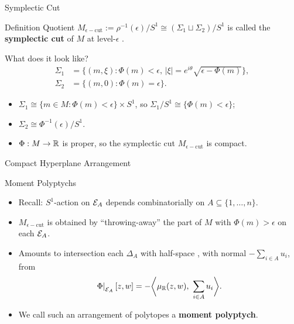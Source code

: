 \begin{frame}{Symplectic Cut}
    \begin{block}{Definition}
        Quotient $M_{\epsilon - \text{cut}} := \rho^{-1}(\epsilon)/S^{1} \cong (\Sigma_{1} \sqcup \Sigma_{2})/S^{1}$ is called the \textbf{symplectic cut} of $M$ at level-$\epsilon$ \cite{lerman1995}.
    \end{block}
    \begin{block}{What does it look like?}
        \vspace*{-18pt}
        \begin{equation*}
            \begin{split}
                \Sigma_{1} &= \big\{ (m,\xi) : \Phi(m) < \epsilon,\, |\xi| = e^{i\theta} \sqrt{\epsilon - \Phi(m)} \big\}, \\
                \Sigma_{2} &= \big\{ (m,0) : \Phi(m) = \epsilon \big\}.
            \end{split}
        \end{equation*}
        \vspace*{-12pt}
        \begin{itemize}
            \item $\Sigma_{1} \cong \{ m \in M : \Phi(m) < \epsilon \} \times S^{1}$, so $\Sigma_{1}/S^{1} \cong \{ \Phi(m) < \epsilon \}$;
            \item $\Sigma_{2} \cong \Phi^{-1}(\epsilon)/S^{1}$.
            \item $\Phi : M \rightarrow \mathbb{R}$ is proper, so the symplectic cut $M_{\epsilon-\text{cut}}$ is compact.
        \end{itemize}
    \end{block}
\end{frame}

\begin{frame}{Compact Hyperplane Arrangement}
    \begin{block}{Moment Polyptychs}
        \begin{itemize}
            \item Recall: $S^{1}$-action on $\mathcal{E}_{A}$ depends combinatorially on $A \subseteq \{ 1,\ldots, n \}$.
            \item $M_{\epsilon-\text{cut}}$ is obtained by ``throwing-away'' the part of $M$ with $\Phi(m) > \epsilon$ on each $\mathcal{E}_{A}$.
            \item Amounts to intersection each $\Delta_{A}$ with half-space \cite{proudfoot2004}, with normal $-\sum_{i \in A} u_{i}$, from
            $$ \left.\Phi\right|_{\mathcal{E}_{A}}[z,w] = - \bigg\langle \mu_{\mathbb{R}}(z,w),\ \sum_{i \in A} u_{i} \bigg\rangle. $$
            \item We call such an arrangement of polytopes a \textbf{moment polyptych}.
        \end{itemize}
    \end{block}
\end{frame}

